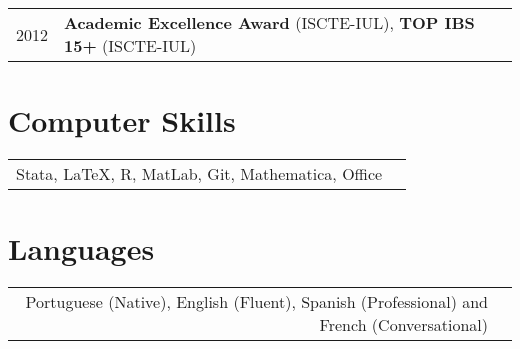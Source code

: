 \documentclass[a4paper,11pt]{article} %
\begin{document}
\begin{tabular}{r|p{13cm}}		
	2012 & \textbf{Academic Excellence Award} (ISCTE-IUL), \textbf{TOP IBS 15+} 	(ISCTE-IUL) \\
\end{tabular}		
%	



\section[Computer Skills]{\faKeyboardO \hspace{3pt} Computer Skills}

\begin{tabular}{rl}
	Stata, {\fb \LaTeX}, \textsc{R}, MatLab, Git, Mathematica, Office
\end{tabular}


\section[Languages]{\faLanguage \hspace{3pt} Languages}

\begin{tabular}{rp{13cm}}
	Portuguese (Native), English (Fluent), Spanish (Professional) and French (Conversational)
	
\end{tabular}

%
%	
\end{document}
